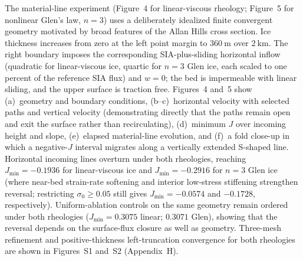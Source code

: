\documentclass[11pt]{article}
\newcommand{\response}[1]{\noindent\textcolor{responseblue}{#1}}
\begin{document}
\response{The material-line experiment (Figure~4 for linear-viscous rheology; Figure~5 for nonlinear Glen's law, \(n=3\)) uses a deliberately idealized finite convergent geometry motivated by broad features of the Allan Hills cross section. Ice thickness increases from zero at the left point margin to \(360~\mathrm{m}\) over \(2~\mathrm{km}\). The right boundary imposes the corresponding SIA-plus-sliding horizontal inflow (quadratic for linear-viscous ice, quartic for \(n=3\) Glen ice, each scaled to one percent of the reference SIA flux) and \(w=0\); the bed is impermeable with linear sliding, and the upper surface is traction free. Figures~4 and~5 show (a)~geometry and boundary conditions, (b--c)~horizontal velocity with selected paths and vertical velocity (demonstrating directly that the paths remain open and exit the surface rather than recirculating), (d)~minimum \(J\) over incoming height and slope, (e)~elapsed material-line evolution, and (f)~a fold close-up in which a negative-\(J\) interval migrates along a vertically extended S-shaped line. Horizontal incoming lines overturn under both rheologies, reaching \(J_{\min}=-0.1936\) for linear-viscous ice and \(J_{\min}=-0.2916\) for \(n=3\) Glen ice (where near-bed strain-rate softening and interior low-stress stiffening strengthen reversal; restricting \(\sigma_0\geq0.05\) still gives \(J_{\min}=-0.0574\) and \(-0.1728\), respectively). Uniform-ablation controls on the same geometry remain ordered under both rheologies (\(J_{\min}=0.3075\) linear; \(0.3071\) Glen), showing that the reversal depends on the surface-flux closure as well as geometry. Three-mesh refinement and positive-thickness left-truncation convergence for both rheologies are shown in Figures~S1 and~S2 (Appendix~H).}

\medskip
\end{document}
